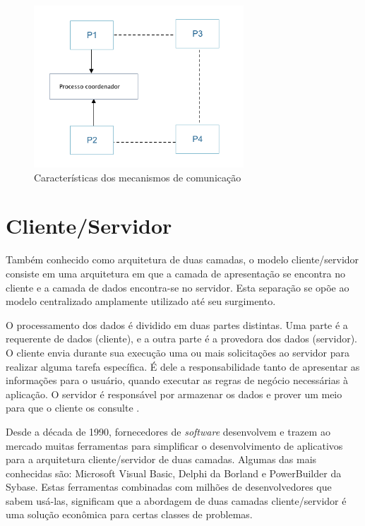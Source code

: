 \begin{figure}
    \centering
    \includegraphics[width=0.7\textwidth]{figuras/ipc.png}
    \caption{Características dos mecanismos de comunicação }
    \label{fig:how-communication-works}
\end{figure}

\section{Cliente/Servidor}\label{sec:clientserver}

Também conhecido como arquitetura de duas camadas, o modelo cliente/servidor consiste em uma arquitetura em que a camada de apresentação se encontra no cliente e a camada de dados encontra-se no servidor. Esta separação se opõe ao modelo centralizado amplamente utilizado até seu surgimento.

O processamento dos dados é dividido em duas partes distintas. Uma parte é a requerente de dados (cliente), e a outra parte é a provedora dos dados (servidor). O cliente envia durante sua execução uma ou mais solicitações ao servidor para realizar alguma tarefa específica. É dele a responsabilidade tanto de apresentar as informações para o usuário, quando executar as regras de negócio necessárias à aplicação. O servidor é responsável por armazenar os dados e prover um meio para que o cliente os consulte \cite{two-tier}.

Desde a década de 1990, fornecedores de \textit{software} desenvolvem e trazem ao mercado muitas ferramentas para simplificar o desenvolvimento de aplicativos para a arquitetura cliente/servidor de duas camadas. Algumas das mais conhecidas são: Microsoft Visual Basic, Delphi da Borland e PowerBuilder da Sybase. Estas ferramentas combinadas com milhões de desenvolvedores que sabem usá-las, significam que a abordagem de duas camadas cliente/servidor é uma solução econômica para certas classes de problemas.

